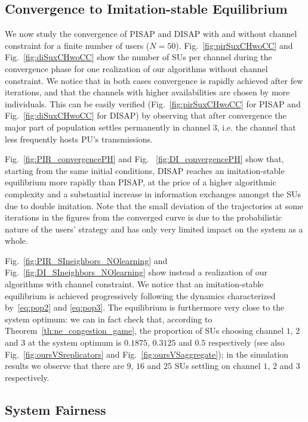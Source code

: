 \documentclass[12pt, onecolumn]{IEEEtran}
\theoremstyle{plain}
\theoremstyle{definition}
\begin{document}
\subsection{Convergence to Imitation-stable Equilibrium}
We now study the convergence of PISAP and DISAP with and without channel constraint for a finite number of users ($N=50$). Fig.~\ref{fig:pirSuxCHwoCC} and Fig.~\ref{fig:diSuxCHwoCC} show the number
of SUs per channel during the convergence phase for one realization of our algorithms without channel constraint.
We notice that in both cases convergence is rapidly achieved after few iterations, and that the channels with higher availabilities are
chosen by more individuals. This can be easily verified (Fig.~\ref{fig:pirSuxCHwoCC} for PISAP and Fig.~\ref{fig:diSuxCHwoCC} for DISAP) by observing that after
convergence the major part of population settles permanently in channel 3, i.e. the channel that less frequently hosts PU's transmissions.


Fig.~\ref{fig:PIR_convergencePH} and Fig.~ \ref{fig:DI_convergencePH} show that, starting from the same initial conditions, DISAP reaches an imitation-stable equilibrium more rapidly than PISAP,
at the price of a higher algorithmic complexity and a substantial increase in information exchanges amongst the SUs due to double imitation.
Note that the small deviation of the trajectories at some iterations in the figures from the converged curve is due to the
probabilistic nature of the users' strategy and has only very limited impact on the system as a whole.


Fig.~\ref{fig:PIR_SIneighbors_NOlearning} and Fig.~\ref{fig:DI_SIneighbors_NOlearning} show instead a realization of our algorithms with channel constraint.
We notice that an imitation-stable equilibrium is achieved progressively following the dynamics characterized by~\eqref{eq:pop2} and \eqref{eq:pop3}.
The equilibrium is furthermore very close to the system optimum: we can in fact check that, according to Theorem~\ref{th:ne_congestion_game}, the proportion of SUs choosing channel $1$, $2$ and $3$ at the system optimum is $0.1875$, $0.3125$ and $0.5$ respectively (see also Fig.~\ref{fig:oursVSreplicators} and Fig.~\ref{fig:oursVSaggregate});
in the simulation results we observe that there are $9$, $16$ and $25$ SUs settling on channel $1$, $2$ and 3 respectively.


\subsection{System Fairness}
\end{document}
